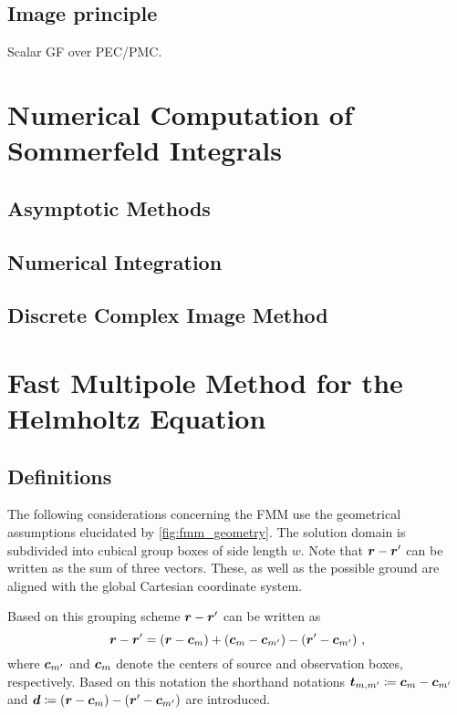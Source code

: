 \subsection{Image principle}

Scalar GF over PEC/PMC. \cite[p. 250]{Sommerfeld1964}


\section{Numerical Computation of Sommerfeld Integrals}

\subsection{Asymptotic Methods}

\subsection{Numerical Integration}

\subsection{Discrete Complex Image Method}


\section{Fast Multipole Method for the Helmholtz Equation}

\subsection{Definitions}

The following considerations concerning the \ac{FMM} use the geometrical
assumptions elucidated by \cref{fig:fmm_geometry}. The solution domain is
subdivided into cubical group boxes of side length $w$.
Note that $\rdiff$ can be written as the sum of three vectors. These, as well
as the possible ground are aligned with the global Cartesian coordinate system.

Based on this grouping scheme $\rdiff$ can be written as
\begin{equation}
	\rdiff =
	\left( \robs - \fmmObsGroupCenter              \right) +
	\left( \fmmObsGroupCenter - \fmmSrcGroupCenter \right) -
	\left( \rsrc - \fmmSrcGroupCenter              \right) \, ,
\end{equation}
where $\fmmSrcGroupCenter$ and $\fmmObsGroupCenter$ denote the centers of
source and observation boxes, respectively.
Based on this notation the shorthand notations 
$\fmmDiffGroupCenters \coloneqq \fmmObsGroupCenter - \fmmSrcGroupCenter$
and 
$\pvec{d} \coloneqq \left( \robs - \fmmObsGroupCenter \right) - \left( \rsrc - \fmmSrcGroupCenter \right)$
are introduced.

